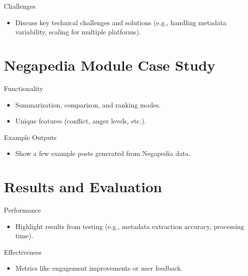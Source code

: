 \documentclass{beamer}
\begin{document}
    \begin{frame}{Challenges}
        \begin{itemize}
            \item Discuss key technical challenges and solutions (e.g., handling metadata variability, scaling for multiple platforms).
        \end{itemize}
    \end{frame}


\section{Negapedia Module Case Study}
    \begin{frame}{Functionality}
        \begin{itemize}
            \item Summarization, comparison, and ranking modes.
            \item Unique features (conflict, anger levels, etc.).
        \end{itemize}
    \end{frame}

    \begin{frame}{Example Outputs}
        \begin{itemize}
            \item Show a few example posts generated from Negapedia data.
        \end{itemize}
    \end{frame}


\section{Results and Evaluation}
    \begin{frame}{Performance}
        \begin{itemize}
            \item Highlight results from testing (e.g., metadata extraction accuracy, processing time).
        \end{itemize}
    \end{frame}

    \begin{frame}{Effectiveness}
        \begin{itemize}
            \item Metrics like engagement improvements or user feedback.
        \end{itemize}
    \end{frame}
\end{document}
